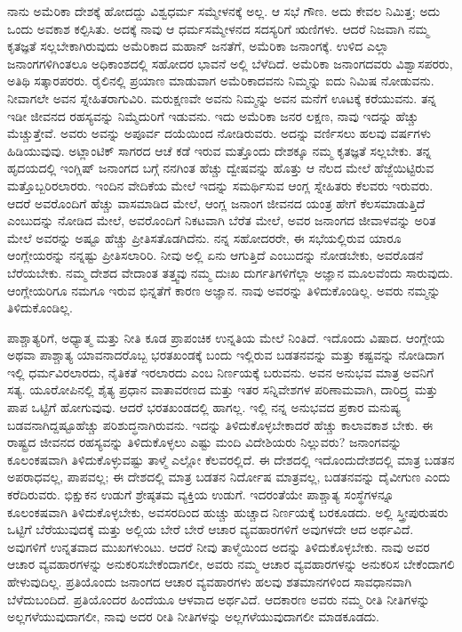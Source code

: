 ನಾನು ಅಮೆರಿಕಾ ದೇಶಕ್ಕೆ ಹೋದದ್ದು ವಿಶ್ವಧರ್ಮ ಸಮ್ಮೇಳನಕ್ಕೆ ಅಲ್ಲ. ಆ ಸಭೆ ಗೌಣ. ಅದು ಕೇವಲ ನಿಮಿತ್ತ; ಅದು ಒಂದು ಅವಕಾಶ ಕಲ್ಪಿಸಿತು. ಅದಕ್ಕೆ ನಾವು ಆ ಧರ್ಮಸಮ್ಮೇಳನದ ಸದಸ್ಯರಿಗೆ ಋಣಿಗಳು. ಆದರೆ ನಿಜವಾಗಿ ನಮ್ಮ ಕೃತಜ್ಞತೆ ಸಲ್ಲಬೇಕಾಗಿರುವುದು ಅಮೆರಿಕಾದ ಮಹಾನ್​ ಜನತೆಗೆ, ಅಮೆರಿಕಾ ಜನಾಂಗಕ್ಕೆ. ಉಳಿದ ಎಲ್ಲಾ ಜನಾಂಗಗಳಿಗಿಂತಲೂ ಅಧಿಕಾಂಶದಲ್ಲಿ ಸಹೋದರ ಭಾವನೆ ಅಲ್ಲಿ ಬೆಳೆದಿದೆ. ಅಮೆರಿಕಾ ಜನಾಂಗದವರು ವಿಶ್ವಾಸಪರರು, ಅತಿಥಿ ಸತ್ಕಾರಪರರು. ರೈಲಿನಲ್ಲಿ ಪ್ರಯಾಣ ಮಾಡುವಾಗ ಅಮೆರಿಕಾದವನು ನಿಮ್ಮನ್ನು ಐದು ನಿಮಿಷ ನೋಡುವನು. ನೀವಾಗಲೇ ಅವನ ಸ್ನೇಹಿತರಾಗುವಿರಿ. ಮರುಕ್ಷಣವೇ ಅವನು ನಿಮ್ಮನ್ನು ಅವನ ಮನೆಗೆ ಊಟಕ್ಕೆ ಕರೆಯುವನು. ತನ್ನ ಇಡೀ ಜೀವನದ ರಹಸ್ಯವನ್ನು ನಿಮ್ಮೆದುರಿಗೆ ಇಡುವನು. ಇದು ಅಮೆರಿಕಾ ಜನರ ಲಕ್ಷಣ, ನಾವು ಇದನ್ನು ಹೆಚ್ಚು ಮೆಚ್ಚುತ್ತೇವೆ. ಅವರು ಅವನ್ನು ಅಪೂರ್ವ ದಯೆಯಿಂದ ನೋಡಿರುವರು. ಅದನ್ನು ವರ್ಣಿಸಲು ಹಲವು ವರ್ಷಗಳು ಹಿಡಿಯುವುವು. ಅಟ್ಲಾಂಟಿಕ್​ ಸಾಗರದ ಆಚೆ ಕಡೆ ಇರುವ ಮತ್ತೊಂದು ದೇಶಕ್ಕೂ ನಮ್ಮ ಕೃತಜ್ಞತೆ ಸಲ್ಲಬೇಕು. ತನ್ನ ಹೃದಯದಲ್ಲಿ ಇಂಗ್ಲಿಷ್​ ಜನಾಂಗದ ಬಗ್ಗೆ ನನಗಿಂತ ಹೆಚ್ಚು ದ್ವೇಷವನ್ನು ಹೊತ್ತು ಆ ನೆಲದ ಮೇಲೆ ಹೆಜ್ಜೆಯಿಟ್ಟಿರುವ ಮತ್ತೊಬ್ಬರಿರಲಾರರು. ಇಂದಿನ ವೇದಿಕೆಯ ಮೇಲೆ ಇದನ್ನು ಸಮರ್ಥಿಸುವ ಆಂಗ್ಲ ಸ್ನೇಹಿತರು ಕೆಲವರು ಇರುವರು. ಆದರೆ ಅವರೊಂದಿಗೆ ಹೆಚ್ಚು ವಾಸಮಾಡಿದ ಮೇಲೆ, ಆಂಗ್ಲ ಜನಾಂಗ ಜೀವನದ ಯಂತ್ರ ಹೇಗೆ ಕೆಲಸಮಾಡುತ್ತಿದೆ ಎಂಬುದನ್ನು ನೋಡಿದ ಮೇಲೆ, ಅವರೊಂದಿಗೆ ನಿಕಟವಾಗಿ ಬೆರೆತ ಮೇಲೆ, ಅವರ ಜನಾಂಗದ ಜೀವಾಳವನ್ನು ಅರಿತ ಮೇಲೆ ಅವರನ್ನು ಅಷ್ಟೂ ಹೆಚ್ಚು ಪ್ರೀತಿಸತೊಡಗಿದೆನು. ನನ್ನ ಸಹೋದರರೇ, ಈ ಸಭೆಯಲ್ಲಿರುವ ಯಾರೂ ಆಂಗ್ಲೇಯರನ್ನು ನನ್ನಷ್ಟು ಪ್ರೀತಿಸಲಾರಿರಿ. ನೀವು ಅಲ್ಲಿ ಏನು ಆಗುತ್ತಿದೆ ಎಂಬುದನ್ನು ನೋಡಬೇಕು, ಅವರೊಡನೆ ಬೆರೆಯಬೇಕು. ನಮ್ಮ ದೇಶದ ವೇದಾಂತ ತತ್ತ್ವವು ನಮ್ಮ ದುಃಖ ದುರ್ಗತಿಗಳಿಗೆಲ್ಲಾ ಅಜ್ಞಾನ ಮೂಲವೆಂದು ಸಾರುವುದು. ಆಂಗ್ಲೇಯರಿಗೂ ನಮಗೂ ಇರುವ ಭಿನ್ನತೆಗೆ ಕಾರಣ ಅಜ್ಞಾನ. ನಾವು ಅವರನ್ನು ತಿಳಿದುಕೊಂಡಿಲ್ಲ. ಅವರು ನಮ್ಮನ್ನು ತಿಳಿದುಕೊಂಡಿಲ್ಲ.

ಪಾಶ್ಚಾತ್ಯರಿಗೆ, ಅಧ್ಯಾತ್ಮ ಮತ್ತು ನೀತಿ ಕೂಡ ಪ್ರಾಪಂಚಿಕ ಉನ್ನತಿಯ ಮೇಲೆ ನಿಂತಿದೆ. ಇದೊಂದು ವಿಷಾದ. ಆಂಗ್ಲೇಯ ಅಥವಾ ಪಾಶ್ಚಾತ್ಯ ಯಾವನಾದ\-ರೊಬ್ಬ ಭರತಖಂಡಕ್ಕೆ ಬಂದು ಇಲ್ಲಿರುವ ಬಡತನವನ್ನು ಮತ್ತು ಕಷ್ಟವನ್ನು ನೋಡಿದಾಗ ಇಲ್ಲಿ ಧರ್ಮವಿರಲಾರದು, ನೈತಿಕತೆ ಇರಲಾರದು ಎಂಬ ನಿರ್ಣಯಕ್ಕೆ ಬರುವನು. ಅವನ ಅನುಭವ ಮಾತ್ರ ಅವನಿಗೆ ಸತ್ಯ. ಯೂರೋಪಿನಲ್ಲಿ ಶೈತ್ಯ ಪ್ರಧಾನ ವಾತಾವರಣದ ಮತ್ತು ಇತರ ಸನ್ನಿವೇಶಗಳ ಪರಿಣಾಮವಾಗಿ, ದಾರಿದ್ರ್ಯ ಮತ್ತು ಪಾಪ ಒಟ್ಟಿಗೆ ಹೋಗುವುವು. ಆದರೆ ಭರತಖಂಡದಲ್ಲಿ ಹಾಗಲ್ಲ. ಇಲ್ಲಿ ನನ್ನ ಅನುಭವದ ಪ್ರಕಾರ ಮನುಷ್ಯ ಬಡವನಾಗಿದ್ದಷ್ಟೂ\break ಹೆಚ್ಚು ಪರಿಶುದ್ಧನಾಗಿರುವನು. ಇದನ್ನು ತಿಳಿದುಕೊಳ್ಳಬೇಕಾದರೆ ಹೆಚ್ಚು ಕಾಲಾವಕಾಶ ಬೇಕು. ಈ ರಾಷ್ಟ್ರದ ಜೀವನದ ರಹಸ್ಯವನ್ನು ತಿಳಿದುಕೊಳ್ಳಲು ಎಷ್ಟು ಮಂದಿ ವಿದೇಶಿಯರು ನಿಲ್ಲುವರು? ಜನಾಂಗವನ್ನು ಕೂಲಂಕಷವಾಗಿ ತಿಳಿದುಕೊಳ್ಳುವಷ್ಟು ತಾಳ್ಮೆ ಎಲ್ಲೋ ಕೆಲವರಲ್ಲಿದೆ. ಈ ದೇಶದಲ್ಲಿ ಇದೊಂದು\break ದೇಶದಲ್ಲಿ ಮಾತ್ರ ಬಡತನ ಅಪರಾಧವಲ್ಲ, ಪಾಪವಲ್ಲ; ಈ ದೇಶದಲ್ಲಿ ಮಾತ್ರ ಬಡತನ ನಿರ್ದೋಷ ಮಾತ್ರವಲ್ಲ, ಬಡತನವನ್ನು ದೈವೀಗುಣ ಎಂದು ಕರೆ\-ದಿರುವರು. ಭಿಕ್ಷುಕನ ಉಡುಗೆ ಶ್ರೇಷ್ಠತಮ ವ್ಯಕ್ತಿಯ ಉಡುಗೆ. ಇದರಂತೆಯೇ ಪಾಶ್ಚಾತ್ಯ ಸಂಸ್ಥೆಗಳನ್ನೂ ಕೂಲಂಕಷವಾಗಿ ತಿಳಿದುಕೊಳ್ಳಬೇಕು, ಅವಸರದಿಂದ ಹುಚ್ಚು ಹುಚ್ಚಾದ ನಿರ್ಣಯಕ್ಕೆ ಬರಕೂಡದು. ಅಲ್ಲಿ ಸ್ತ್ರೀಪುರುಷರು ಒಟ್ಟಿಗೆ ಬೆರೆಯುವುದಕ್ಕೆ ಮತ್ತು ಅಲ್ಲಿಯ ಬೇರೆ ಬೇರೆ ಆಚಾರ ವ್ಯವಹಾರಗಳಿಗೆ ಅವುಗಳದೇ ಆದ ಅರ್ಥವಿದೆ. ಅವುಗಳಿಗೆ ಉನ್ನತವಾದ ಮುಖಗಳುಂಟು. ಆದರೆ ನೀವು ತಾಳ್ಮೆಯಿಂದ ಅದನ್ನು ತಿಳಿದುಕೊಳ್ಳಬೇಕು. ನಾವು ಅವರ ಆಚಾರ ವ್ಯವಹಾರಗಳನ್ನು ಅನುಕರಿಸಬೇಕೆಂದಾಗಲೀ, ಅವರು ನಮ್ಮ ಆಚಾರ ವ್ಯವಹಾರಗಳನ್ನು ಅನುಕರಿಸ ಬೇಕೆಂದಾಗಲಿ ಹೇಳುವುದಿಲ್ಲ. ಪ್ರತಿಯೊಂದು ಜನಾಂಗದ ಆಚಾರ ವ್ಯವಹಾರಗಳು ಹಲವು ಶತಮಾನಗಳಿಂದ ಸಾವಧಾನವಾಗಿ ಬೆಳೆದುಬಂದಿದೆ. ಪ್ರತಿಯೊಂದರ ಹಿಂದೆಯೂ ಆಳವಾದ ಅರ್ಥವಿದೆ. ಆದಕಾರಣ ಅವರು ನಮ್ಮ ರೀತಿ ನೀತಿಗಳನ್ನು ಅಲ್ಲಗಳೆಯುವುದಾಗಲೀ, ನಾವು ಅದರ ರೀತಿ ನೀತಿಗಳನ್ನು ಅಲ್ಲಗಳೆಯುವುದಾಗಲೀ ಮಾಡಕೂಡದು.

